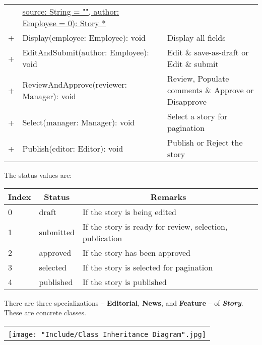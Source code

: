 \documentclass{article}
\begin{document}
\begin{center}
\begin{scriptsize}
\begin{tabular}{|lllll|l|p{7cm}|}
   & \multicolumn{4}{l|}{\quad \quad \underline{source: String = "", author: Employee = 0): Story *}} & &  \\
 + & \multicolumn{4}{l|}{Display(employee: Employee): void}  & & Display all fields \\ 
 + & \multicolumn{4}{l|}{EditAndSubmit(author: Employee): void} & & Edit \& save-as-draft or Edit \& submit \\ 
 + & \multicolumn{4}{l|}{ReviewAndApprove(reviewer: Manager): void} & & Review, Populate comments \& Approve or Disapprove \\
 + & \multicolumn{4}{l|}{Select(manager: Manager): void}  & & Select a story for pagination \\
 + & \multicolumn{4}{l|}{Publish(editor: Editor): void}   & & Publish or Reject the story \\ \cline{1-5} \cline{7-7}
\end{tabular}
\end{scriptsize}
\end{center}

The status values are:

\begin{center}
\begin{scriptsize}
\begin{tabular}{|l|l|l|} \hline
\multicolumn{1}{|c}{\bf Index} & \multicolumn{1}{|c}{\bf Status} & \multicolumn{1}{|c|}{\bf Remarks} \\ \hline
0 & draft & If the story is being edited \\
1 & submitted & If the story is ready for review, selection, publication \\
2 & approved & If the story has been approved \\
3 & selected & If the story is selected for pagination \\
4 & published & If the story is published \\ \hline
\end{tabular}
\end{scriptsize}
\end{center}

There are three specializations -- {\bf Editorial}, {\bf News}, and {\bf Feature} -- of {\bf \em Story}. These are concrete classes. 

\begin{center}
\begin{tabular}{|l|} \hline
\\
\texttt{[image: "Include/Class Inheritance Diagram".jpg]} \\ \hline
\end{tabular}
\end{center}
\end{document}
